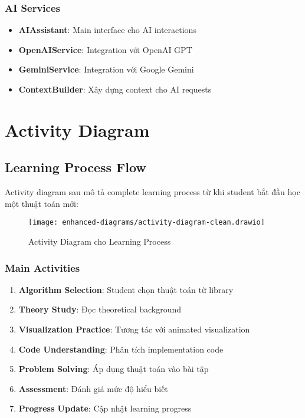 \subsubsection{AI Services}

\begin{itemize}
    \item \textbf{AIAssistant}: Main interface cho AI interactions
    \item \textbf{OpenAIService}: Integration với OpenAI GPT
    \item \textbf{GeminiService}: Integration với Google Gemini
    \item \textbf{ContextBuilder}: Xây dựng context cho AI requests
\end{itemize}

\section{Activity Diagram}
\label{sec:activity-diagram}

\subsection{Learning Process Flow}
\label{subsec:learning-flow}

Activity diagram sau mô tả complete learning process từ khi student bắt đầu học một thuật toán mới:

\begin{figure}[H]
\centering
\texttt{[image: enhanced-diagrams/activity-diagram-clean.drawio]}
\caption{Activity Diagram cho Learning Process}
\label{fig:activity-learning}
\end{figure}

\subsubsection{Main Activities}

\begin{enumerate}
    \item \textbf{Algorithm Selection}: Student chọn thuật toán từ library
    \item \textbf{Theory Study}: Đọc theoretical background
    \item \textbf{Visualization Practice}: Tương tác với animated visualization
    \item \textbf{Code Understanding}: Phân tích implementation code
    \item \textbf{Problem Solving}: Áp dụng thuật toán vào bài tập
    \item \textbf{Assessment}: Đánh giá mức độ hiểu biết
    \item \textbf{Progress Update}: Cập nhật learning progress
\end{enumerate}

